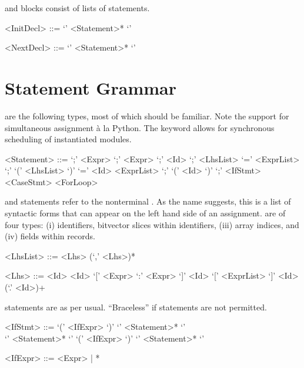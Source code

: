  and  blocks consist of lists of statements.
\begin{grammar}
     <InitDecl> ::=  `{' <Statement>* `}'

     <NextDecl> ::=  `{' <Statement>* `}'

\end{grammar}

\section{Statement Grammar}
 are the following types, most of which should be familiar. Note the support for simultaneous assignment \`a la Python. The keyword  allows for synchronous scheduling of instantiated modules.
\begin{grammar}
     <Statement> 
       ::=  `;' 
       \alt {} <Expr> `;'
       \alt {} <Expr> `;'
       \alt {} <Id>  `;'
       \alt <LhsList> `=' <ExprList> `;'
       \alt {} `(' <LhsList> `)' `=' <Id> <ExprList> `;'
       \alt {} `(' <Id> `)' `;'
       \alt <IfStmt>
       \alt <CaseStmt>
       \alt <ForLoop>
\end{grammar}

 and  statements refer to the nonterminal . As the name suggests, this is a list of syntactic forms that can appear on the left hand side of an assignment.  are of four types: (i) identifiers, bitvector slices within identifiers, (iii) array indices, and (iv) fields within records.
\begin{grammar}
    <LhsList> ::= <Lhs> (`,' <Lhs>)*

    <Lhs> ::= <Id>
          \alt <Id> `[' <Expr> `:' <Expr> `]'
          \alt <Id> `[' <ExprList> `]'
          \alt <Id> (`.' <Id>)+
\end{grammar}

 statements are as per usual. ``Braceless'' if statements are not permitted.
\begin{grammar}
    <IfStmt> ::= 
     `(' <IfExpr> `)'  `{' <Statement>* `}' \\  `{' <Statement>* `}'
    \alt {} `(' <IfExpr> `)'  `{' <Statement>* `}'

    <IfExpr> ::= <Expr> | *
\end{grammar}

